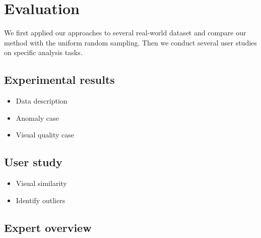 \section{Evaluation}
We first applied our approaches to several real-world dataset and compare our method with the uniform random sampling. Then we conduct several user studies on specific analysis tasks. 
\subsection{Experimental results}

\begin{itemize}[noitemsep]
    \item Data description
    \item Anomaly case
    \item Visual quality case
\end{itemize}

\subsection{User study}
\begin{itemize}[noitemsep]
    \item Visual similarity
    \item Identify outliers
\end{itemize}

\subsection{Expert overview}

